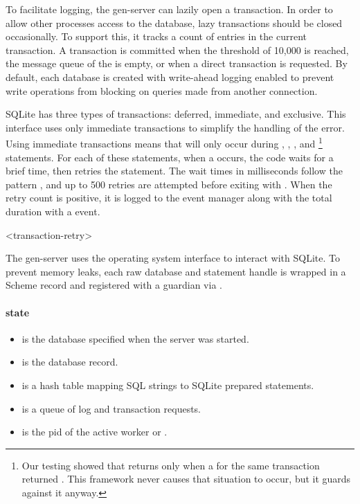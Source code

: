 To facilitate logging, the  gen-server can lazily open a
transaction. In order to allow other processes access to the database,
lazy transactions should be closed occasionally. To support this, it
tracks a count of entries in the current transaction. A transaction is
committed when the threshold of 10,000 is reached, the message queue
of the  is empty, or when a direct transaction is requested.
By default, each database is created with write-ahead logging enabled
to prevent write operations from blocking on queries made from another
connection.

SQLite has three types of transactions: deferred, immediate, and
exclusive. This interface uses only immediate transactions to simplify
the handling of the  error.  Using immediate
transactions means that  will only occur during
, , ,
and \footnote{Our testing showed that
   returns  only when a
   for the same transaction returned
  . This framework never causes that situation to
  occur, but it guards against it anyway.} statements. For each of
these statements, when a  occurs, the code waits
for a brief time, then retries the statement. The wait times in
milliseconds follow the pattern , and up to 500 retries are attempted before
exiting with .  When
the retry count is positive, it is logged to the event manager along
with the total duration with a  event.

\begin{pubevent}{<transaction-retry>}
\end{pubevent}

The  gen-server uses the operating system interface to
interact with SQLite. To prevent memory leaks, each raw database and
statement handle is wrapped in a Scheme record and registered with a
guardian via .

\paragraph* {state}
\begin{itemize}
\item {} is the database specified when the server was
  started.
\item {} is the database record.
\item {} is a hash table mapping SQL strings to SQLite
  prepared statements.
\item {} is a queue of log and transaction requests.
\item {} is the pid of the active worker or .
\end{itemize}

